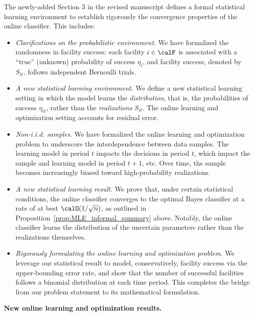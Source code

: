 \documentclass[11pt]{article}
\begin{document}
The newly-added Section 3 in the revised manuscript defines a formal statistical learning environment to establish rigorously the convergence properties of the online classifier. This includes:
\begin{itemize}[topsep=-2pt,itemsep=-2pt]
\item[--] \emph{Clarifications on the probabilistic environment.} We have formalized the randomness in facility success: each facility $i\in\calF$ is associated with a ``true'' (unknown) probability of success $\eta_{i}$, and facility success, denoted by $S_{it}$, follows independent Bernoulli trials.
\item[--] \emph{A new statistical learning environment.} We define a new statistical learning setting in which the model learns the \textit{distribution}, that is, the probabilities of success $\eta_{it}$, rather than the \textit{realizations} $S_{it}$. The online learning and optimization setting accounts for residual error.
\item[--] \emph{Non-i.i.d. samples.} We have formalized the online learning and optimization problem to underscore the interdependence between data samples. The learning model in period $t$ impacts the decisions in period $t$, which impact the sample and learning model in period $t+1$, etc. Over time, the sample becomes increasingly biased toward high-probability realizations.
\item[--] \emph{A new statistical learning result.} We prove that, under certain statistical conditions, the online classifier converges to the optimal Bayes classifier at a rate of at best $\calO(1/\sqrt{n})$, as outlined in Proposition~\ref{prop:MLE_informal_summary} above. Notably, the online classifier learns the distribution of the uncertain parameters rather than the realizations themselves.
\item[--] \emph{Rigorously formulating the online learning and optimization problem.} We leverage our statistical result to model, conservatively, facility success via the upper-bounding error rate, and show that the number of successful facilities follows a binomial distribution at each time period. This completes the bridge from our problem statement to its mathematical formulation.
\end{itemize}

\textbf{New online learning and optimization results.}
\end{document}
